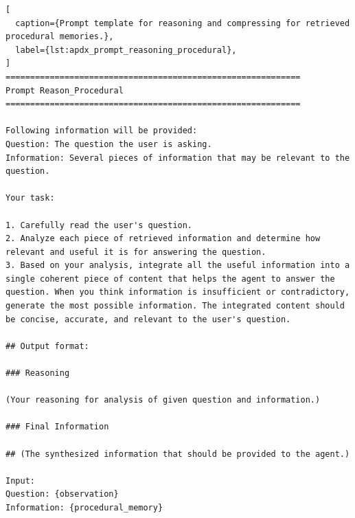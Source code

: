 \begin{lstlisting}[
  caption={Prompt template for reasoning and compressing for retrieved procedural memories.},
  label={lst:apdx_prompt_reasoning_procedural},
]
============================================================
Prompt Reason_Procedural
============================================================

Following information will be provided:
Question: The question the user is asking.
Information: Several pieces of information that may be relevant to the question.

Your task:

1. Carefully read the user's question.
2. Analyze each piece of retrieved information and determine how relevant and useful it is for answering the question.
3. Based on your analysis, integrate all the useful information into a single coherent piece of content that helps the agent to answer the question. When you think information is insufficient or contradictory, generate the most possible information. The integrated content should be concise, accurate, and relevant to the user's question.

## Output format:

### Reasoning

(Your reasoning for analysis of given question and information.)

### Final Information

## (The synthesized information that should be provided to the agent.)

Input:
Question: {observation}
Information: {procedural_memory}
\end{lstlisting}
